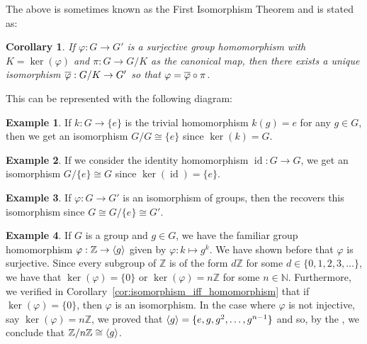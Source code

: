\documentclass[12pt,letterpaper,DIV=11,final]{scrartcl}
\theoremstyle{plain}
\newtheorem{corollary}{Corollary}
\theoremstyle{definition}
\newtheorem{example}{Example}[section]
\theoremstyle{remark}
\DeclareMathOperator{\id}{id}
\begin{document}
The above  is sometimes known as the First Isomorphism Theorem and is stated as:

\begin{corollary}
  If $\varphi: G \to G'$ is a surjective group homomorphism with $K = \ker(\varphi)$ and $\pi : G \to G/K$ as the canonical map, then there exists a unique isomorphism $\overline{\varphi} : G/K \to G'$ so that $\varphi = \overline{\varphi} \circ \pi$.
\end{corollary}

This can be represented with the following diagram:
\begin{center}
\end{center}

\begin{example}
  If $k : G \to \{ e \}$ is the trivial homomorphism $k(g) = e$ for any $g \in G$, then we get an isomorphism $G/G \cong \{ e \}$ since $\ker(k) = G$.
\end{example}

\begin{example}
  If we consider the identity homomorphism $\id : G \to G$, we get an isomorphism $G/\{ e \} \cong G$ since $\ker(\id) = \{ e \}$.
\end{example}

\begin{example}
  If $\varphi : G \to G'$ is an isomorphism of groups, then the  recovers this isomorphism since $G \cong G / \{ e \} \cong G'$.
\end{example}

\begin{example}\label{ex:cyclicgroup_homomorphism}
  If $G$ is a group and $g \in G$, we have the familiar group homomorphism $\varphi : \mathbb{Z} \to \braket{g}$ given by $\varphi : k \mapsto g^k$.
  We have shown before that $\varphi$ is surjective.
  Since every subgroup of $\mathbb{Z}$ is of the form $d \mathbb{Z}$ for some $d \in \{ 0, 1, 2, 3, \dots \}$, we have that $\ker(\varphi) = \{ 0 \}$ or $\ker(\varphi) = n \mathbb{Z}$ for some $n \in \mathbb{N}$.
  Furthermore, we verified in Corollary~\ref{cor:isomorphism_iff_homomorphism} that if $\ker(\varphi) = \{ 0 \}$, then $\varphi$ is an isomorphism.
  In the case where $\varphi$ is not injective, say $\ker(\varphi) = n \mathbb{Z}$, we proved that $\braket{g} = \{ e, g, g^2, \dots, g^{n - 1} \}$ and so, by the , we conclude that $\mathbb{Z}/n \mathbb{Z} \cong \braket{g}$.
\end{example}
\end{document}
